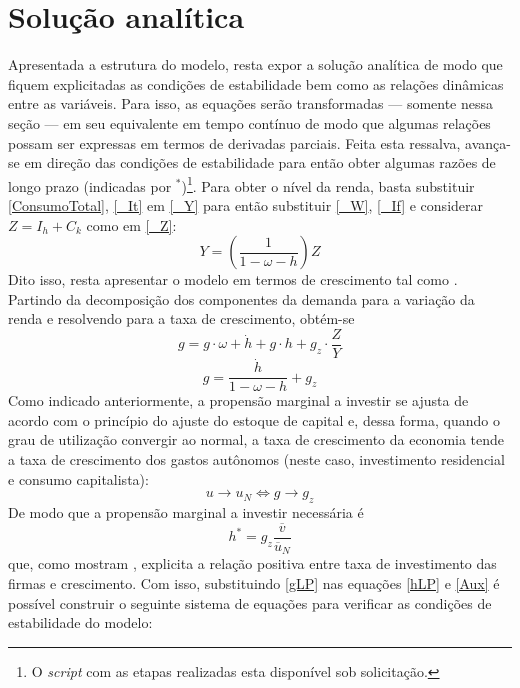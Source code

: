 \section{Solução analítica}
\label{SecAnalitica}

Apresentada a estrutura do modelo, resta expor a solução analítica de modo que fiquem explicitadas as condições de estabilidade bem como as relações dinâmicas entre as variáveis. 
Para isso, as equações serão transformadas --- somente nessa seção --- em seu equivalente em tempo contínuo de modo que algumas relações possam ser expressas em termos de derivadas parciais.
Feita esta ressalva, avança-se em direção das condições de estabilidade para então obter algumas razões de longo prazo (indicadas por $^*$)\footnote{O \textit{script} com as etapas realizadas esta disponível sob solicitação.}.
Para obter o nível da renda, basta substituir \ref{ConsumoTotal}, \ref{_It} em \ref{_Y} para então substituir \ref{_W}, \ref{_If} e considerar $Z = I_h + C_k$ como em \ref{_Z}:
\begin{equation}
    \label{AnaliticaNivel}
    Y = \left(\frac{1}{1-\omega - h}\right)Z
\end{equation}
Dito isso, resta apresentar o modelo em termos de crescimento tal como \textcite{freitas_growth_2015}. Partindo da decomposição dos componentes da demanda para a variação da renda e resolvendo para a taxa de crescimento, obtém-se
$$
g = g\cdot \omega + \dot h + g\cdot h + g_z\cdot \frac{Z}{Y}
$$
\begin{equation}
\label{gLP}
    g = \frac{\dot h}{1 - \omega - h} + g_z
\end{equation}
Como indicado anteriormente, a propensão marginal a investir se ajusta de acordo com o princípio do ajuste do estoque de capital e, dessa forma, quando o grau de utilização convergir ao normal, a taxa de crescimento da economia tende a taxa de crescimento dos gastos autônomos (neste caso, investimento residencial e consumo capitalista): 
\begin{equation}
u \to u_N \Leftrightarrow g \to g_z
\end{equation}
De modo que a propensão marginal a investir necessária é
\begin{equation}
\label{hLP}
h^* = g_z\frac{\overline v}{\overline u_N}
\end{equation}
que, como mostram \textcite{fagundes_role_2017}, explicita a relação positiva entre taxa de investimento das firmas e crescimento. Com isso, substituindo \ref{gLP} nas equações \ref{hLP} e \ref{Aux} é possível construir o seguinte sistema de equações para verificar as condições de estabilidade do modelo:

